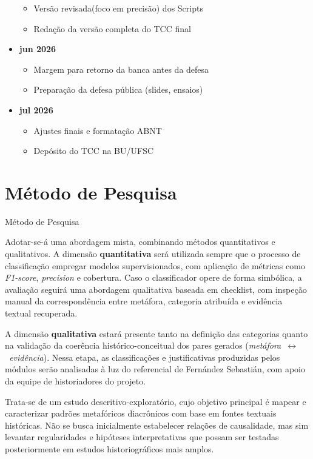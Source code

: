\begin{itemize}
  \begin{itemize}
  \tightlist
  \item
    Versão revisada(foco em precisão) dos Scripts
  \item
    Redação da versão completa do TCC final
  \end{itemize}
\item
  \textbf{jun 2026}

  \begin{itemize}
  \tightlist
  \item
    Margem para retorno da banca antes da defesa
  \item
    Preparação da defesa pública (slides, ensaios)
  \end{itemize}
\item
  \textbf{jul 2026}

  \begin{itemize}
  \tightlist
  \item
    Ajustes finais e formatação ABNT
  \item
    Depósito do TCC na BU/UFSC
  \end{itemize}
\end{itemize}

\section{\textbf{Método de Pesquisa}}{Método de Pesquisa}\label{muxe9todo-de-pesquisa}

Adotar-se-á uma abordagem mista, combinando métodos quantitativos e
qualitativos. A dimensão \textbf{quantitativa} será utilizada sempre que
o processo de classificação empregar modelos supervisionados, com
aplicação de métricas como \emph{F1-score}, \emph{precision} e
cobertura. Caso o classificador opere de forma simbólica, a avaliação
seguirá uma abordagem qualitativa baseada em checklist, com inspeção
manual da correspondência entre metáfora, categoria atribuída e
evidência textual recuperada.

A dimensão \textbf{qualitativa} estará presente tanto na definição das
categorias quanto na validação da coerência histórico-conceitual dos
pares gerados (\emph{metáfora~$\leftrightarrow$~evidência}). Nessa etapa, as
classificações e justificativas produzidas pelos módulos serão
analisadas à luz do referencial de Fernández Sebastián, com apoio da
equipe de historiadores do projeto.

Trata-se de um estudo descritivo-exploratório, cujo objetivo principal é
mapear e caracterizar padrões metafóricos diacrônicos com base em fontes
textuais históricas. Não se busca inicialmente estabelecer relações de
causalidade, mas sim levantar regularidades e hipóteses interpretativas
que possam ser testadas posteriormente em estudos historiográficos mais
amplos.

